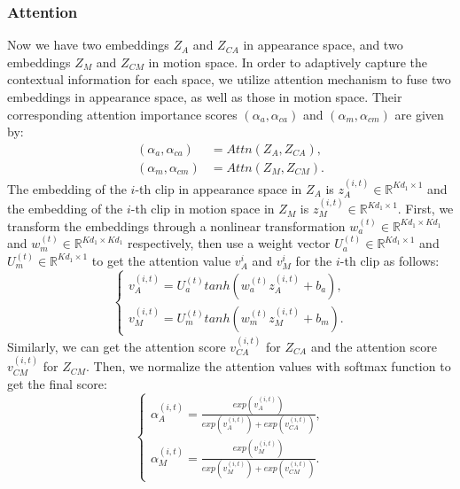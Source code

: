 \documentclass[journal]{IEEEtran}
\begin{document}
\subsubsection{Attention} \label{sec:Attn}
Now we have two embeddings $Z_A$ and $Z_{CA}$ in appearance space, and two embeddings $Z_{M}$ and $Z_{CM}$ in motion space. In order to adaptively capture the contextual information for each space, we utilize attention mechanism to fuse two embeddings in appearance space, as well as those in motion space. Their corresponding attention importance scores $\left(\alpha_a, \alpha_{ca}\right)$ and $\left(\alpha_m, \alpha_{cm}\right)$ are given by:
\begin{align}
    \left(\alpha_a, \alpha_{ca}\right) & = Attn\left(Z_A, Z_{CA}\right) \label{eq:attn},\\
    \left(\alpha_m, \alpha_{cm}\right) & = Attn\left(Z_M, Z_{CM}\right) \label{eq:attn2}.
    \end{align}
The embedding of the $i$-th clip in appearance space in $Z_A$ is $z^{\left(i,t\right)}_A \in \mathbb{R}^{Kd_1 \times 1}$ and the embedding of the $i$-th clip in motion space in $Z_M$ is $z^{\left(i,t\right)}_M \in \mathbb{R}^{Kd_1 \times 1}$. First, we transform the embeddings through a nonlinear transformation $w^{\left(t\right)}_a \in \mathbb{R}^{Kd_1 \times Kd_1}$ and $w^{\left(t\right)}_m \in \mathbb{R}^{Kd_1 \times Kd_1}$ respectively, then use a weight vector $U^{\left(t\right)}_a \in \mathbb{R}^{Kd_1 \times 1}$ and $U^{\left(t\right)}_m \in \mathbb{R}^{Kd_1 \times 1}$ to get the attention value $v^i_A$ and $v^i_M$ for the $i$-th clip as follows:
\begin{equation}
\left\{
\begin{aligned}
    v^{\left(i,t\right)}_A = U^{\left(t\right)}_a tanh(w^{\left(t\right)}_a z^{\left(i,t\right)}_A + b_a),\\
    v^{\left(i,t\right)}_M = U^{\left(t\right)}_m tanh(w^{\left(t\right)}_m z^{\left(i,t\right)}_M + b_m).
\end{aligned}
\right.
\end{equation}
Similarly, we can get the attention score $v^{\left(i,t\right)}_{CA}$ for $Z_{CA}$ and the attention score $v^{\left(i,t\right)}_{CM}$ for $Z_{CM}$. Then, we normalize the attention values with softmax function to get the final score:
\begin{equation}
\left\{
\begin{aligned}
    \alpha^{\left(i,t\right)}_A = \frac{exp\left(v^{\left(i,t\right)}_{A}\right)}{exp\left(v^{\left(i,t\right)}_{A}\right) + exp\left(v^{\left(i,t\right)}_{CA}\right)}, \\
    \alpha^{\left(i,t\right)}_M = \frac{exp\left(v^{\left(i,t\right)}_{M}\right)}{exp\left(v^{\left(i,t\right)}_{M}\right) + exp\left(v^{\left(i,t\right)}_{CM}\right)}.
    \end{aligned}
    \right.
\end{equation}
\end{document}
